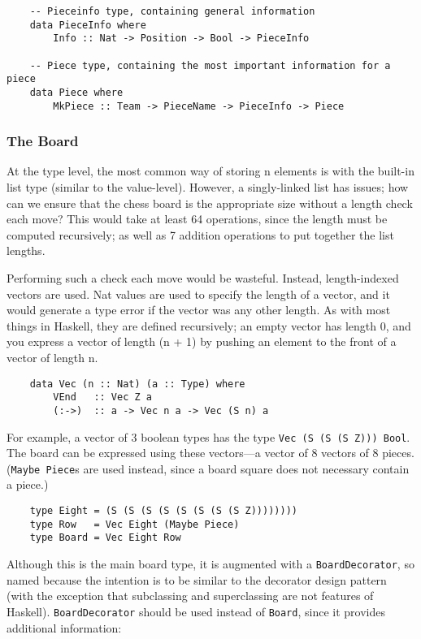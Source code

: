 \documentclass[12pt, a4paper]{scrartcl}
\begin{document}
\begin{lstlisting}
    -- Pieceinfo type, containing general information
    data PieceInfo where
        Info :: Nat -> Position -> Bool -> PieceInfo

    -- Piece type, containing the most important information for a piece
    data Piece where
        MkPiece :: Team -> PieceName -> PieceInfo -> Piece
\end{lstlisting}

\subsubsection{The Board}

At the type level, the most common way of storing n elements is with the built-in list type (similar to the value-level). However, a singly-linked list has issues; how can we ensure that the chess board is the appropriate size without a length check each move? This would take at least 64 operations, since the length must be computed recursively; as well as 7 addition operations to put together the list lengths.

Performing such a check each move would be wasteful. Instead, length-indexed vectors are used. Nat values are used to specify the length of a vector, and it would generate a type error if the vector was any other length. As with most things in Haskell, they are defined recursively; an empty vector has length 0, and you express a vector of length (n + 1) by pushing an element to the front of a vector of length n.

\begin{lstlisting}
    data Vec (n :: Nat) (a :: Type) where
        VEnd   :: Vec Z a
        (:->)  :: a -> Vec n a -> Vec (S n) a
\end{lstlisting}

For example, a vector of 3 boolean types has the type \lstinline{Vec (S (S (S Z))) Bool}. The board can be expressed using these vectors---a vector of 8 vectors of 8 pieces. (\lstinline{Maybe Piece}s are used instead, since a board square does not necessary contain a piece.)

\begin{lstlisting}
    type Eight = (S (S (S (S (S (S (S (S Z))))))))
    type Row   = Vec Eight (Maybe Piece)
    type Board = Vec Eight Row
\end{lstlisting}

Although this is the main board type, it is augmented with a \lstinline{BoardDecorator}, so named because the intention is to be similar to the decorator design pattern\cite{decorator} (with the exception that subclassing and superclassing are not features of Haskell). \lstinline{BoardDecorator} should be used instead of \lstinline{Board}, since it provides additional information:
\end{document}
